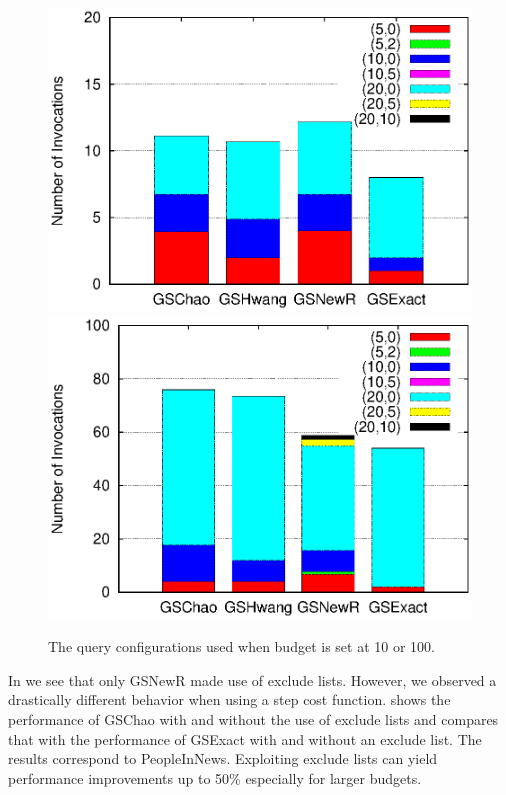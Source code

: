 \begin{figure}[t]
   	 \includegraphics[clip,scale=0.32]{figs/queryConfBudget10.eps}
	\includegraphics[clip,scale=0.32]{figs/queryConfBudget100.eps}
	\caption{The query configurations used when budget is set at 10 or 100.}\label{fig:queryconf}
		\vspace{-5pt}
\end{figure}

 In  we see that only GSNewR made use of exclude lists. However, we observed a drastically different behavior when using a step cost function.  shows the performance of GSChao with and without the use of exclude lists and compares that with the performance of GSExact with and without an exclude list. The results correspond to PeopleInNews. Exploiting exclude lists can yield performance improvements up to 50\% especially for larger budgets.

